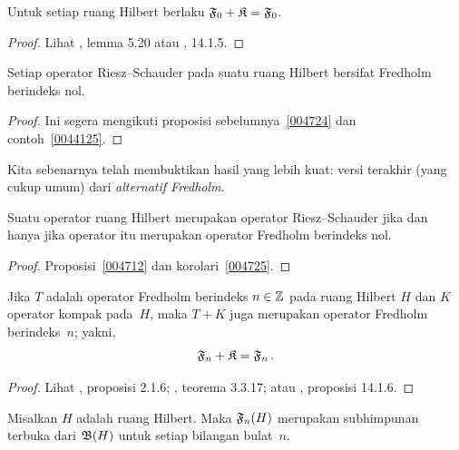 \begin{prop}\label{004724} Untuk setiap ruang Hilbert berlaku $\mathfrak{F}_0 + \mathfrak{K} = \mathfrak{F}_0$.
\end{prop}

\begin{proof} Lihat \cite{Douglas:1972}, lemma 5.20 atau \cite{Wegge-Olsen:1993}, 14.1.5. \ns
\end{proof}

\begin{cor}\label{004725}
Setiap operator Riesz--Schauder pada suatu ruang Hilbert bersifat Fredholm berindeks nol.
\end{cor}

\begin{proof} Ini segera mengikuti proposisi sebelumnya~\ref{004724} dan
contoh~\ref{0044125}.
\end{proof}

Kita sebenarnya telah membuktikan hasil yang lebih kuat: versi terakhir (yang cukup umum) dari
\emph{alternatif Fredholm}.

\begin{cor}\label{0047253} Suatu operator ruang Hilbert merupakan operator
Riesz--Schauder jika dan hanya jika operator itu merupakan operator Fredholm berindeks nol.
\end{cor}

\begin{proof} Proposisi~\ref{004712} dan korolari~\ref{004725}.
\end{proof}

\begin{prop} Jika $T$ adalah operator Fredholm berindeks $n \in \mathbb{Z}$ pada ruang Hilbert $H$
dan $K$ operator kompak pada~$H$, maka $T + K$ juga merupakan operator Fredholm berindeks~$n$; yakni,
  \[ \mathfrak{F}_n + \mathfrak{K} = \mathfrak{F}_n\,. \]
\end{prop}

\begin{proof} Lihat \cite{HigsonR:2000}, proposisi 2.1.6; \cite{Pedersen:1995}, teorema
3.3.17; atau \cite{Wegge-Olsen:1993}, proposisi 14.1.6. \ns
\end{proof}

\begin{prop} Misalkan $H$ adalah ruang Hilbert. Maka $\mathfrak{F}_n(H)$ merupakan subhimpunan terbuka dari $\mathfrak{B}(H)$
untuk setiap bilangan bulat~$n$.
\end{prop}


